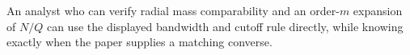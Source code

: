 An analyst who can verify radial mass comparability and an order-\(m\) expansion of \(N/Q\) can use the displayed bandwidth and cutoff rule directly, while knowing exactly when the paper supplies a matching converse.